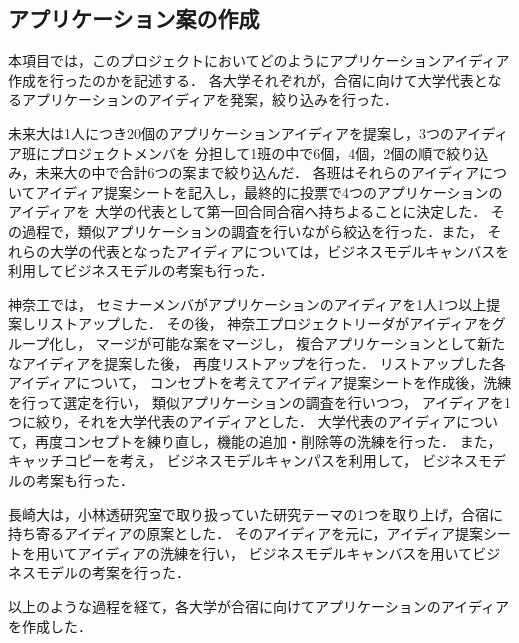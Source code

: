 \subsection{アプリケーション案の作成}

\par
本項目では，このプロジェクトにおいてどのようにアプリケーションアイディア作成を行ったのかを記述する．
各大学それぞれが，合宿に向けて大学代表となるアプリケーションのアイディアを発案，絞り込みを行った．

\par
未来大は1人につき20個のアプリケーションアイディアを提案し，3つのアイディア班にプロジェクトメンバを
分担して1班の中で6個，4個，2個の順で絞り込み，未来大の中で合計6つの案まで絞り込んだ．
各班はそれらのアイディアについてアイディア提案シートを記入し，最終的に投票で4つのアプリケーションのアイディアを
大学の代表として第一回合同合宿へ持ちよることに決定した．
その過程で，類似アプリケーションの調査を行いながら絞込を行った．また，
それらの大学の代表となったアイディアについては，ビジネスモデルキャンバスを利用してビジネスモデルの考案も行った．

\par
神奈工では， セミナーメンバがアプリケーションのアイディアを1人1つ以上提案しリストアップした．
その後， 神奈工プロジェクトリーダがアイディアをグループ化し， マージが可能な案をマージし，
複合アプリケーションとして新たなアイディアを提案した後， 再度リストアップを行った．
リストアップした各アイディアについて， コンセプトを考えてアイディア提案シートを作成後，洗練を行って選定を行い，
類似アプリケーションの調査を行いつつ， アイディアを1つに絞り，それを大学代表のアイディアとした．
大学代表のアイディアについて，再度コンセプトを練り直し，機能の追加・削除等の洗練を行った．
また， キャッチコピーを考え， ビジネスモデルキャンパスを利用して， ビジネスモデルの考案も行った．

\par 
長崎大は，小林透研究室で取り扱っていた研究テーマの1つを取り上げ，合宿に持ち寄るアイディアの原案とした．
そのアイディアを元に，アイディア提案シートを用いてアイディアの洗練を行い，
ビジネスモデルキャンバスを用いてビジネスモデルの考案を行った．

\par
以上のような過程を経て，各大学が合宿に向けてアプリケーションのアイディアを作成した．
